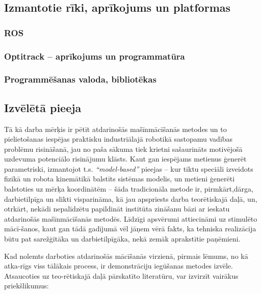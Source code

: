 \documentclass[12pt, a4paper]{article}
\numberwithin{equation}{section} %
\begin{document}
\subsection{Izmantotie rīki, aprīkojums un platformas}

\subsubsection{ROS}

\subsubsection{Optitrack -- aprīkojums un programmatūra}

\subsubsection{Programmēšanas valoda, bibliotēkas}

\subsection{Izvēlētā pieeja}

Tā kā darba mērķis ir pētīt atdarinošās mašīnmācīšanās metodes un to pielietošanas iespējas praktisku industriālajā robotikā sastopamu vadības problēmu risināšanā, jau no paša sākuma tiek krietni sašaurināts motivējošā uzdevuma potenciālo risinājumu klāsts. Kaut gan iespējams metienus ģenerēt parametriski, izmantojot t.s. \textit{``model-based''} pieejas -- kur tiktu speciāli izveidots fizikā un robota kinemātikā balstīts sistēmas modelis, un metieni ģenerēti balstoties uz mērķa koordinātēm -- šāda tradicionāla metode ir, pirmkārt,dārga, darbietilpīga un slikti visparināma, kā jau apspriests darba teorētiskajā daļā, un, otrkārt, nekādi nepalīdzētu papildināt institūta zināšanu bāzi ar ieskatu atdarinošās mašīnmācīšanās metodēs. Līdzīgi apsvērumi attiecināmi uz stimulēto mācī-šanos, kaut gan tādā gadījumā vēl jāņem vērā fakts, ka tehniska realizācija būtu pat sarežģītāka un darbietilpīgāka, nekā zemāk aprakstītie paņēmieni.

Kad nolemts darboties atdarinošās mācīšanās virzienā, pirmais lēmums, no kā atka-rīgs viss tālākais process, ir demonstrāciju iegūšanas metodes izvēle. Atsaucoties uz teo-rētiskajā daļā pārskatīto literatūru, var izvirzīt vairākus priekšlikumus:
\end{document}
